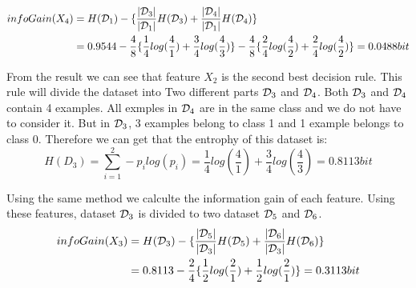 \documentclass[10pt]{article}
\begin{document}
	\begin{equation}
	\begin{aligned}
	infoGain(X_4)&=H({\cal D}_1)-\{\frac{\vert {\cal D}_3\vert}{\vert {\cal D}_1 \vert}H({\cal D}_3)+\frac{\vert {\cal D}_4\vert}{\vert {\cal D}_1 \vert}H({\cal D}_4)\}\\
	&=0.9544-\frac{4}{8}\{ \frac{1}{4}log(\frac{4}{1})+\frac{3}{4}log(\frac{4}{3})\}-\frac{4}{8}\{ \frac{2}{4}log(\frac{4}{2})+\frac{2}{4}log(\frac{4}{2})\}=0.0488 bit
	\end{aligned}
	\end{equation} 
	\par
    From the result we can see that feature $X_2$ is the second best decision rule. This rule will divide the dataset into Two different parts ${\cal D}_3$ and ${\cal D}_4$. Both ${\cal D}_3$ and ${\cal D}_4$ contain 4 examples. All exmples in ${\cal D}_4$ are in the same class and we do not have to consider it. But in ${\cal D}_3$, 3 examples belong to class 1 and 1 example belongs to class 0. Therefore we can get that the entrophy of this dataset is: 
    \begin{equation}
    H(D_3)=\sum_{i=1}^{2} -p_i log(p_i)=\frac{1}{4}log(\frac{4}{1})+\frac{3}{4}log(\frac{4}{3})=0.8113 bit
    \end{equation}\par
    Using the same method we calculte the information gain of each feature. Using these features, dataset ${\cal D}_3$ is divided to two dataset ${\cal D}_5$ and ${\cal D}_6$.
    \begin{equation}
    \begin{aligned}
    infoGain(X_3)&=H({\cal D}_3)-\{\frac{\vert {\cal D}_5\vert}{\vert {\cal D}_3\vert}H({\cal D}_5)+\frac{\vert {\cal D}_6\vert}{\vert {\cal D}_3\vert}H({\cal D}_6)\}\\
    &=0.8113-\frac{2}{4}\{ \frac{1}{2}log(\frac{2}{1})+\frac{1}{2}log(\frac{2}{1})\}=0.3113 bit
    \end{aligned}
    \end{equation} 
    
\end{document}
